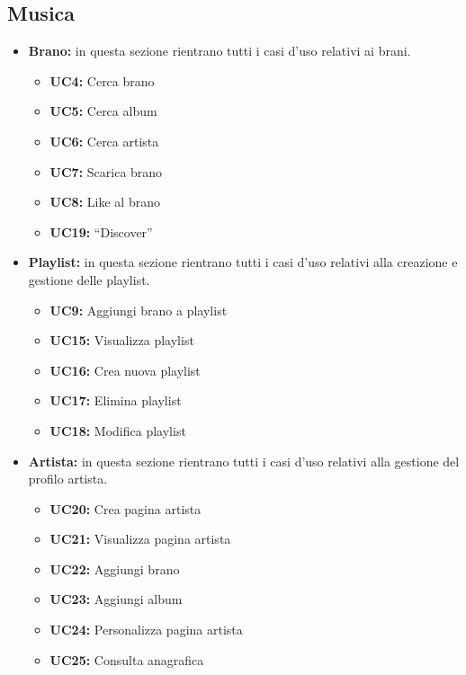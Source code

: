 \subsection{Musica}
\begin{itemize}
    \item \textbf{Brano:} in questa sezione rientrano tutti i casi d'uso relativi ai brani.
    \begin{itemize}
        \item \textbf{UC4:} Cerca brano
        \item \textbf{UC5:} Cerca album
        \item \textbf{UC6:} Cerca artista
        \item \textbf{UC7:} Scarica brano
        \item \textbf{UC8:} Like al brano
        \item \textbf{UC19:} ``Discover'' 
    \end{itemize} 
    
    \item \textbf{Playlist:} in questa sezione rientrano tutti i casi d'uso relativi alla creazione e gestione delle playlist.
    \begin{itemize}
        \item \textbf{UC9:} Aggiungi brano a playlist
        \item \textbf{UC15:} Visualizza playlist 
        \item \textbf{UC16:} Crea nuova playlist 
        \item \textbf{UC17:} Elimina playlist
        \item \textbf{UC18:} Modifica playlist
    \end{itemize}
    
    \item \textbf{Artista:} in questa sezione rientrano tutti i casi d'uso relativi alla gestione del profilo artista.
    \begin{itemize}
        \item  \textbf{UC20:} Crea pagina artista 
        \item  \textbf{UC21:} Visualizza pagina artista 
        \item  \textbf{UC22:} Aggiungi brano 
        \item  \textbf{UC23:} Aggiungi album 
        \item  \textbf{UC24:} Personalizza pagina artista 
        \item  \textbf{UC25:} Consulta anagrafica
    \end{itemize} 
\end{itemize}

